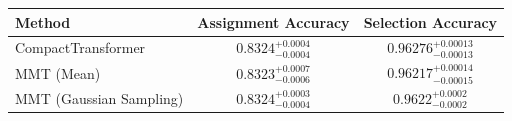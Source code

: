     \begin{tabular}{lcc}
        \toprule
        Method & Assignment Accuracy & Selection Accuracy \\
        \midrule
        CompactTransformer & $0.8324^{+0.0004}_{-0.0004}$ & $0.96276^{+0.00013}_{-0.00013}$ \\
        MMT (Mean) & $0.8323^{+0.0007}_{-0.0006}$ & $0.96217^{+0.00014}_{-0.00015}$ \\
        MMT (Gaussian Sampling) & $0.8324^{+0.0003}_{-0.0004}$ & $0.9622^{+0.0002}_{-0.0002}$ \\
        \bottomrule
    \end{tabular}